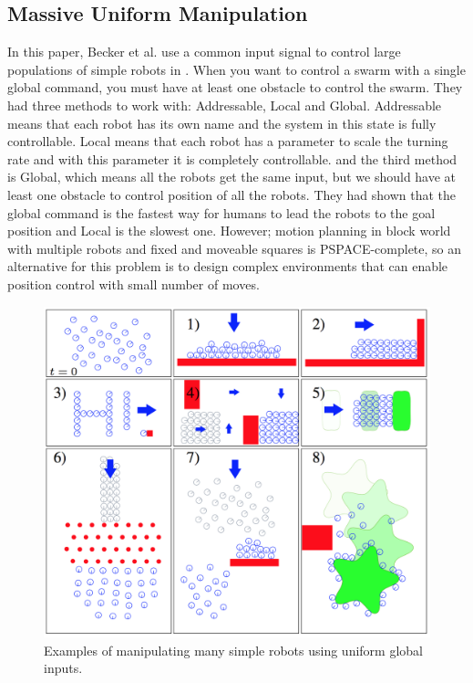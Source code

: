 \documentclass[letterpaper, 10 pt, conference]{ieeeconf}
\begin{document}
\subsection{Massive Uniform Manipulation}

In this paper, Becker et al. use a common input signal to control large populations of simple robots in \cite{AaronManipulation2013}. When you want to control a swarm with a single global command, you must have at least one obstacle to control the swarm. They had three methods to work with: Addressable, Local and Global. Addressable means that each robot has its own name and the system in this state is fully controllable. Local means that each robot has a parameter to scale the turning rate and with this parameter it is completely controllable. and the third method is Global, which means all the robots get the same input, but we should have at least one obstacle to control position of all the robots. They had shown that the global command is the fastest way for humans to lead the robots to the goal position and Local is the slowest one. However; motion planning in block world with multiple robots and fixed and moveable squares is PSPACE-complete, so an alternative for this problem is to design complex environments that can enable position control with small number of moves. 
\begin{figure}[h]
\begin{center}
\includegraphics[width=\columnwidth]{massive.png}
\caption{Examples of manipulating many simple robots using uniform global inputs\cite{AaronManipulation2013}.
\label{fig:Becker}}
\end{center}
\end{figure}
\end{document}
